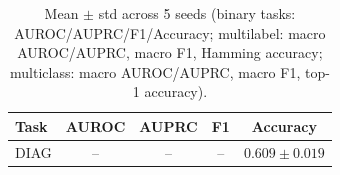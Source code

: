\begin{table}[h]
\centering
\begin{tabular}{l|cccc}
\hline
Task & AUROC & AUPRC & F1 & Accuracy \\
\hline
DIAG & -- & -- & -- & $0.609 \pm 0.019$ \\
\hline
\end{tabular}
\caption{Mean $\pm$ std across 5 seeds (binary tasks: AUROC/AUPRC/F1/Accuracy; multilabel: macro AUROC/AUPRC, macro F1, Hamming accuracy; multiclass: macro AUROC/AUPRC, macro F1, top-1 accuracy).}
\end{table}
